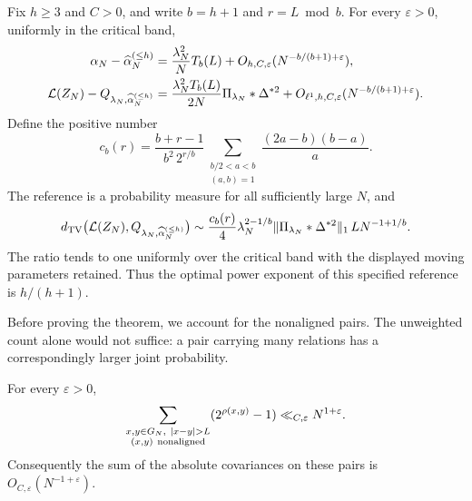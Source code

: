 \begin{theorem}
\label{p13:channels:hierarchy}
Fix $h\geq3$ and $C>0$, and write $b=h+1$ and $r=L\bmod b$.
For every $\varepsilon>0$, uniformly in the critical band,
\begin{align}
 \alpha_N-\widehat\alpha_N^{(\leq h)}
  &=\frac{\lambda_N^2}{N}T_b(L)
       +O_{h,C,\varepsilon}(N^{-b/(b+1)+\varepsilon}),
       \label{p13:channels:cumulant-remainder}\\
 \mathcal L(Z_N)-Q_{\lambda_N,\widehat\alpha_N^{(\leq h)}}
  &=\frac{\lambda_N^2T_b(L)}{2N}\Pi_{\lambda_N}*\Delta^{*2}
       +O_{\ell^1,h,C,\varepsilon}(N^{-b/(b+1)+\varepsilon}).
       \label{p13:channels:law-remainder}
\end{align}
Define the positive number
\begin{equation}
 c_b(r)=\frac{b+r-1}{b^2\,2^{r/b}}
       \sum_{\substack{b/2<a<b\\(a,b)=1}}
                    \frac{(2a-b)(b-a)}a .
 \label{p13:channels:phase-constant}
\end{equation}
The reference is a probability measure for all sufficiently large $N$, and
\begin{equation}
 d_{\mathrm{TV}}\bigl(\mathcal L(Z_N),Q_{\lambda_N,\widehat\alpha_N^{(\leq h)}}\bigr)
 \sim \frac{c_b(r)}4\lambda_N^{2-1/b}
       \|\Pi_{\lambda_N}*\Delta^{*2}\|_1\,
       L N^{-1+1/b}.
 \label{p13:channels:tv-equivalent}
\end{equation}
The ratio tends to one uniformly over the critical band with the displayed
moving parameters retained.  Thus the optimal power exponent of this
specified reference is $h/(h+1)$.
\end{theorem}

Before proving the theorem, we account for the nonaligned pairs.  The
unweighted count alone would not suffice: a pair carrying many relations
has a correspondingly larger joint probability.

\begin{lemma}
\label{p13:channels:weighted-nonaligned}
For every $\varepsilon>0$,
\begin{equation}
 \sum_{\substack{x,y\in G_N,\ |x-y|>L\\(x,y)\ {\rm nonaligned}}}
             (2^{\rho(x,y)}-1)
       \ll_{C,\varepsilon}N^{1+\varepsilon}.
 \label{p13:channels:nonaligned-weight}
\end{equation}
Consequently the sum of the absolute covariances on these pairs is
$O_{C,\varepsilon}(N^{-1+\varepsilon})$.
\end{lemma}

